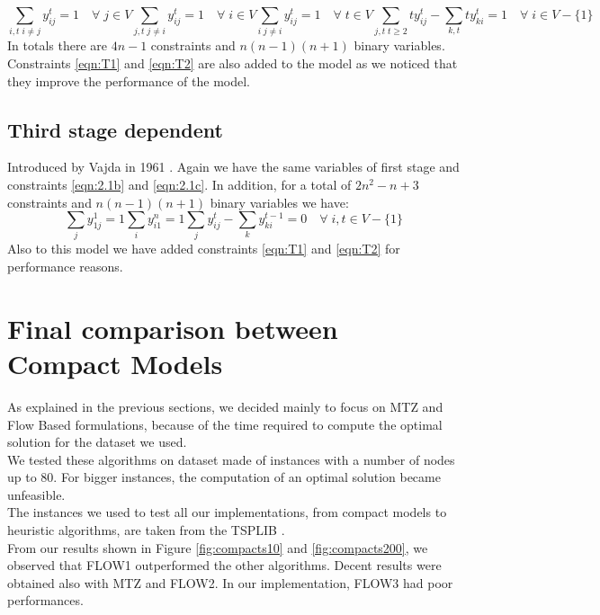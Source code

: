 \begin{subequations} 
	\begin{equation}
		\sum_{i,t \; i \neq j} y_{ij}^t = 1 \quad \forall \; j \in V
	\end{equation}
	\begin{equation}
		\sum_{j,t \; j \neq i} y_{ij}^t = 1 \quad \forall \; i \in V
	\end{equation}
	\begin{equation}
		\sum_{i \; j \neq i} y_{ij}^t = 1 \quad \forall \; t \in V
	\end{equation}
	\begin{equation}
		\sum_{j,t \; t \geq 2} ty_{ij}^t - \sum_{k,t} ty_{ki}^t = 1 \quad \forall \;i \in V-\lbrace 1 \rbrace
	\end{equation}
\end{subequations}
In totals there are $4n-1$ constraints and $n(n-1)(n+1)$ binary variables. Constraints \ref{eqn:T1} and \ref{eqn:T2} are also added to the model as we noticed that they improve the performance of the model.

\subsection{Third stage dependent}
Introduced by Vajda in 1961 \cite{timestage3}. Again we have the same variables of first stage and constraints \ref{eqn:2.1b} and \ref{eqn:2.1c}. In addition, 
for a total of $2n^2-n+3$ constraints and $n(n-1)(n+1)$ binary variables we have:
\begin{subequations}
	\begin{equation}
		\sum_{j} y_{1j}^1 = 1
	\end{equation}
	\begin{equation}
		\sum_{i} y_{i1}^n = 1
	\end{equation}
	\begin{equation}
		\sum_{j} y_{ij}^t - \sum_{k} y_{ki}^{t-1} = 0 \quad \forall \; i,t \in V-\lbrace 1 \rbrace
	\end{equation}
\end{subequations}
Also to this model we have added constraints \ref{eqn:T1} and \ref{eqn:T2} for performance reasons.
\newpage
\section{Final comparison between Compact Models}
As explained in the previous sections, we decided mainly to focus on MTZ and Flow Based formulations, because of the time required to compute the optimal solution for the dataset we used.\\
We tested these algorithms on dataset made of instances with a number of nodes up to 80. For bigger instances, the computation of an optimal solution became unfeasible.\\
The instances we used to test all our implementations, from compact models to heuristic algorithms, are taken from the TSPLIB \cite{tsplib}. \\
From our results shown in Figure \ref{fig:compacts10} and \ref{fig:compacts200}, we observed that FLOW1 outperformed the other algorithms. Decent results were obtained also with MTZ and FLOW2. In our implementation, FLOW3 had poor performances.


